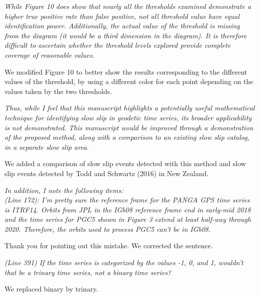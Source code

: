 \documentclass[letterpaper, 12pt]{article}
\begin{document}
\bigskip

\textit{While Figure 10 does show that nearly all the thresholds examined demonstrate a higher true positive rate than false positive, not all threshold value have equal identification power. Additionally, the actual value of the threshold is missing from the diagram (it would be a third dimension in the diagram). It is therefore difficult to ascertain whether the threshold levels explored provide complete coverage of reasonable values.}

\bigskip

We modified Figure 10 to better show the results corresponding to the different values of the threshold, by using a different color for each point depending on the values taken by the two thresholds.

\bigskip

\textit{Thus, while I feel that this manuscript highlights a potentially useful mathematical technique for identifying slow slip in geodetic time series, its broader applicability is not demonstrated. This manuscript would be improved through a demonstration of the proposed method, along with a comparison to an existing slow slip catalog, in a separate slow slip area.}

\bigskip

We added a comparison of slow slip events detected with this method and slow slip events detected by Todd and Schwartz (2016) in New Zealand.

\bigskip

\textit{In addition, I note the following items:} \\

\textit{(Line 172): I'm pretty sure the reference frame for the PANGA GPS time series is ITRF14. Orbits from JPL in the IGb08 reference frame end in early-mid 2018 and the time series for PGC5 shown in Figure 3 extend at least half-way through 2020. Therefore, the orbits used to process PGC5 can't be in IGb08.}

\bigskip

Thank you for pointing out this mistake. We corrected the sentence.

\bigskip

\textit{(Line 391) If the time series is categorized by the values -1, 0, and 1, wouldn't that be a trinary time series, not a binary time series?}

\bigskip
 
We replaced binary by trinary.

\bigskip
\end{document}
